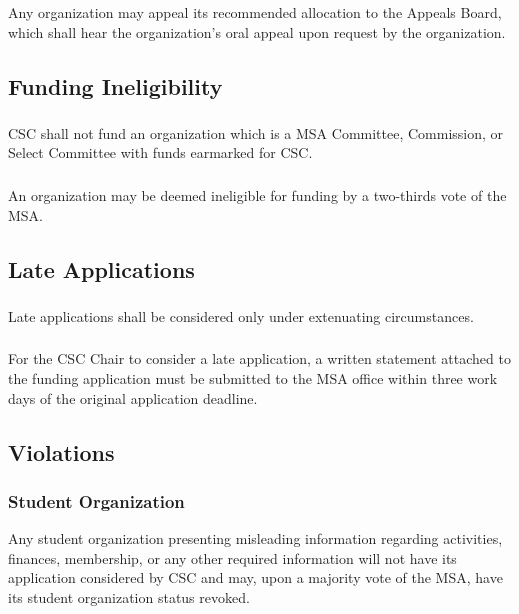 \subsubsection{}
Any organization may appeal its recommended allocation to the Appeals Board, which shall hear the organization's oral appeal upon request by the organization.
 
\subsection{Funding Ineligibility}
\subsubsection{}
CSC shall not fund an organization which is a MSA Committee, Commission, or Select Committee with funds earmarked for CSC.  
\subsubsection{}
An organization may be deemed ineligible for funding by a two-thirds vote of the MSA.

\subsection{Late Applications}
\subsubsection{}
Late applications shall be considered only under extenuating circumstances.
\subsubsection{}
For the CSC Chair to consider a late application, a written statement attached to the funding application must be submitted to the MSA office within three work days of the original application deadline.

\subsection{Violations}
\subsubsection{Student Organization}
\subsubsubsection{}
Any student organization presenting misleading information regarding activities, finances, membership, or any other required information will not have its application considered by CSC and may, upon a majority vote of the MSA, have its student organization status revoked.  

